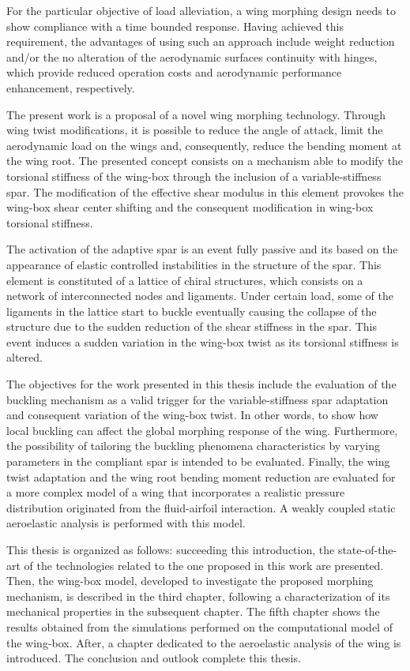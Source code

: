 For the particular objective of load alleviation, a wing morphing design needs to show compliance with a time bounded response. Having achieved this requirement, the advantages of using such an approach include weight reduction and/or the no alteration of the aerodynamic surfaces continuity with hinges, which provide reduced operation costs and aerodynamic performance enhancement, respectively.

The present work is a proposal of a novel wing morphing technology. Through wing twist modifications, it is possible to reduce the angle of attack, limit the aerodynamic load on the wings and, consequently, reduce the bending moment at the wing root. The presented concept consists on a mechanism able to modify the torsional stiffness of the wing-box through the inclusion of a variable-stiffness spar. The modification of the effective shear modulus in this element provokes the wing-box shear center shifting and the consequent modification in wing-box torsional stiffness. 

The activation of the adaptive spar is an event fully passive and its based on the appearance of elastic controlled instabilities in the structure of the spar. This element is constituted of a lattice of chiral structures, which consists on a network of interconnected nodes and ligaments. Under certain load, some of the ligaments in the lattice start to buckle eventually causing the collapse of the structure due to the sudden reduction of the shear stiffness in the spar. This event induces a sudden variation in the wing-box twist as its torsional stiffness is altered.

The objectives for the work presented in this thesis include the evaluation of the buckling mechanism as a valid trigger for the variable-stiffness spar adaptation and consequent variation of the wing-box twist. In other words, to show how local buckling can affect the global morphing response of the wing. Furthermore, the possibility of tailoring the buckling phenomena characteristics by varying parameters in the compliant spar is intended to be evaluated. Finally, the wing twist adaptation and the wing root bending moment reduction are evaluated for a more complex model of a wing that incorporates a realistic pressure distribution originated from the fluid-airfoil interaction. A weakly coupled static aeroelastic analysis is performed with this model.

This thesis is organized as follows: succeeding this introduction, the state-of-the-art of the technologies related to the one proposed in this work are presented. Then, the wing-box model, developed to investigate the proposed morphing mechanism, is described in the third chapter, following a characterization of its mechanical properties in the subsequent chapter. The fifth chapter shows the results obtained from the simulations performed on the computational model of the wing-box. After, a chapter dedicated to the aeroelastic analysis of the wing is introduced. The conclusion and outlook complete this thesis.